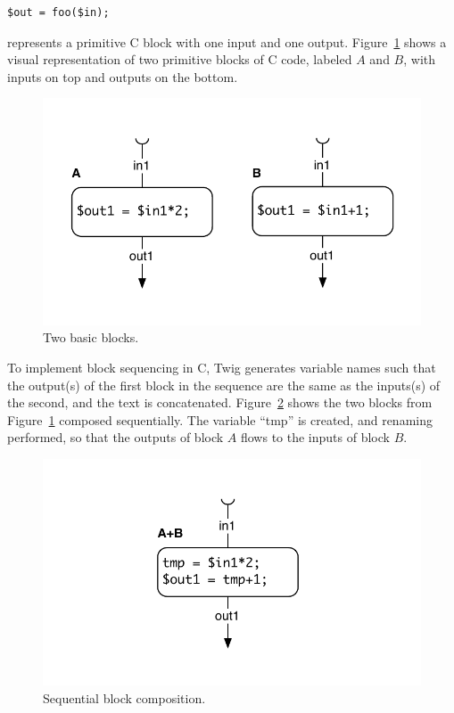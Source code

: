 \begin{verbatim}
$out = foo($in);
\end{verbatim}

represents a primitive C block with one input and one output.
Figure~\ref{fig:blocks} shows a visual representation of two primitive blocks
of C code, labeled $A$ and $B$, with inputs on top and outputs on the bottom.

\begin{figure}[ht]
\centering
\includegraphics[width=0.75\columnwidth]{images/code-gen1}
\caption{Two basic blocks.}
\label{fig:blocks}
\end{figure}

To implement block sequencing in C, Twig generates variable names such that
the output(s) of the first block in the sequence are the same as the inputs(s)
of the second, and the text is concatenated. Figure~\ref{fig:codegen-seq}
shows the two blocks from Figure~\ref{fig:blocks} composed sequentially. The
variable ``tmp'' is created, and renaming performed, so that the outputs of
block $A$ flows to the inputs of block $B$.

\begin{figure}[ht]
\centering
\includegraphics[width=0.75\columnwidth]{images/code-gen2}
\caption{Sequential block composition.}
\label{fig:codegen-seq}
\end{figure}

